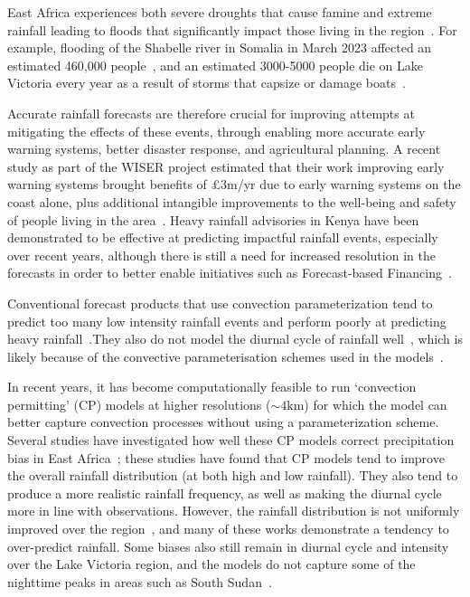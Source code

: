 \documentclass{article}
\begin{document}
East Africa experiences both severe droughts that cause famine \citep{gebremeskel_haile_droughts_2019} and extreme rainfall leading to floods that significantly impact those living in the region~\citep{kilavi_extreme_2018,wainwright_extreme_2021}. For example, flooding of the Shabelle river in Somalia in March 2023 affected an estimated 460,000 people~\citep{floodlist_somalia_2023}, and an estimated 3000-5000 people die on Lake Victoria every year as a result of storms that capsize or damage boats~\citep{watkiss_socio-economic_2020, ifrc_world_2014}.

Accurate rainfall forecasts are therefore crucial for improving attempts at mitigating the effects of these events, through enabling more accurate early warning systems, better disaster response, and agricultural planning. A recent study as part of the WISER project estimated that their work improving early warning systems brought benefits of £3m/yr due to early warning systems on the coast alone, plus additional intangible improvements to the well-being and safety of people living in the area~\citep{watkiss_socio-economic_2021}. Heavy rainfall advisories in Kenya have been demonstrated to be effective at predicting impactful rainfall events, especially over recent years, although there is still a need for increased resolution in the forecasts in order to better enable initiatives such as Forecast-based Financing~\citep{macleod_are_2021}.


Conventional forecast products that use convection parameterization tend to predict too many low intensity rainfall events and perform poorly at predicting heavy rainfall~\citep{woodhams_what_2018, chamberlain_forecasting_2014, vogel_skill_2018, walker_skill_2019, bechtold_representing_2014, haiden_intercomparison_2012}.They also do not model the diurnal cycle of rainfall well~\citep{kim_tropical_2013, macleod_drivers_2021, bechtold_simulation_2004}, which is likely because of the convective parameterisation schemes used in the models~\citep{vogel_skill_2018, marsham_role_2013, bechtold_representing_2014}. 

In recent years, it has become computationally feasible to run `convection permitting' (CP) models at higher resolutions ($\sim4\text{km}$) for which the model can better capture convection processes without using a parameterization scheme. Several studies have investigated how well these CP models correct precipitation bias in East Africa~\citep{finney_implications_2019, cafaro_convection-permitting_2021, woodhams_what_2018, chamberlain_forecasting_2014, kendon_enhanced_2019, senior_convection-permitting_2021}; these studies have found that CP models tend to improve the overall rainfall distribution (at both high and low rainfall). They also tend to produce a more realistic rainfall frequency, as well as making the diurnal cycle more in line with observations. However, the rainfall distribution is not uniformly improved over the region~\citep{senior_convection-permitting_2021}, and many of these works demonstrate a tendency to over-predict rainfall. Some biases also still remain in diurnal cycle and intensity over the Lake Victoria region, and the models do not capture some of the nighttime peaks in areas such as South Sudan~\citep{finney_implications_2019, chamberlain_forecasting_2014}. 
\end{document}
